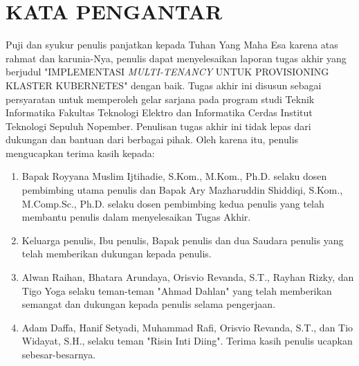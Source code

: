 \chapter*{KATA PENGANTAR}


\vspace{2ex}


Puji dan syukur penulis panjatkan kepada Tuhan Yang Maha Esa karena atas rahmat
dan karunia-Nya, penulis dapat menyelesaikan laporan tugas akhir yang berjudul
"IMPLEMENTASI \emph{MULTI-TENANCY} UNTUK PROVISIONING KLASTER KUBERNETES" dengan
baik. Tugas akhir ini disusun sebagai persyaratan untuk memperoleh gelar sarjana
pada program studi Teknik Informatika Fakultas Teknologi Elektro dan Informatika
Cerdas Institut Teknologi Sepuluh Nopember. Penulisan tugas akhir ini tidak lepas
dari dukungan dan bantuan dari berbagai pihak.
Oleh karena itu, penulis mengucapkan terima kasih kepada:

\begin{enumerate}[nolistsep]

  \item Bapak Royyana Muslim Ijtihadie, S.Kom., M.Kom., Ph.D. selaku dosen pembimbing
    utama penulis dan Bapak Ary Mazharuddin Shiddiqi, S.Kom., M.Comp.Sc., Ph.D. selaku dosen
    pembimbing kedua penulis yang telah membantu penulis dalam menyelesaikan Tugas Akhir.

  \item Keluarga penulis, Ibu penulis, Bapak penulis dan dua Saudara penulis yang telah 
    memberikan dukungan kepada penulis.

    
  \item Alwan Raihan, Bhatara Arundaya, Orisvio Revanda, S.T., Rayhan Rizky, dan Tigo Yoga
    selaku teman-teman "Ahmad Dahlan" yang telah memberikan semangat dan dukungan kepada
    penulis selama pengerjaan.

  \item Adam Daffa, Hanif Setyadi, Muhammad Rafi, Orisvio Revanda, S.T., dan Tio
    Widayat, S.H., selaku teman "Risin Inti Diing". Terima kasih penulis ucapkan
    sebesar-besarnya.

\end{enumerate}

